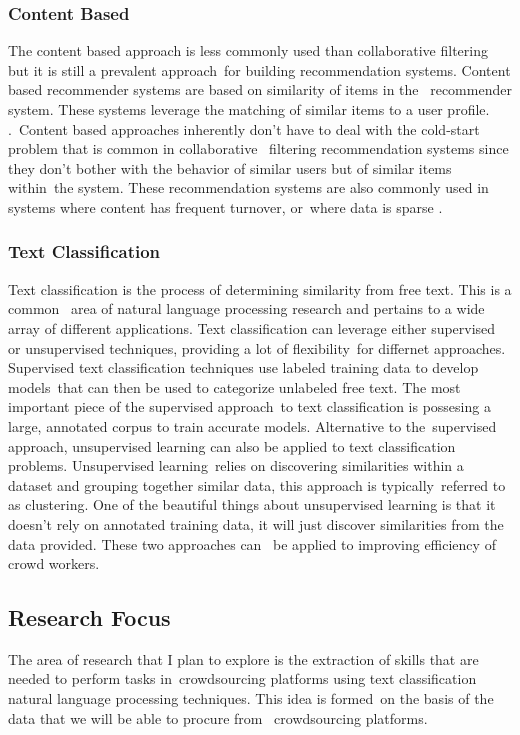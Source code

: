 \documentclass[letterpaper,12pt]{article}
\begin{document}
\subsubsection{Content Based}
The content based approach is less commonly used than collaborative filtering but it is still a prevalent approach\
for building recommendation systems. Content based recommender systems are based on similarity of items in the \
recommender system. These systems leverage the matching of similar items to a user profile. \cite{pazzani2007content}.\
Content based approaches inherently don't have to deal with the cold-start problem that is common in collaborative \
filtering recommendation systems since they don't bother with the behavior of similar users but of similar items within\
the system. These recommendation systems are also commonly used in systems where content has frequent turnover, or\
where data is sparse \cite{okura2017embedding}.

\subsubsection{Text Classification}
Text classification is the process of determining similarity from free text. This is a common \
area of natural language processing research and pertains to a wide array of different applications. 
Text classification can leverage either supervised or unsupervised techniques, providing a lot of flexibility\
for differnet approaches. Supervised text classification techniques use labeled training data to develop models\
that can then be used to categorize unlabeled free text. The most important piece of the supervised approach\
to text classification is possesing a large, annotated corpus to train accurate models. Alternative to the\
supervised approach, unsupervised learning can also be applied to text classification problems. Unsupervised learning\
relies on discovering similarities within a dataset and grouping together similar data, this approach is typically\
referred to as clustering. One of the beautiful things about unsupervised learning is that it doesn't rely on
annotated training data, it will just discover similarities from the data provided. These two approaches can \ 
be applied to improving efficiency of crowd workers.

\subsection{Research Focus}
The area of research that I plan to explore is the extraction of skills that are needed to perform tasks in\
crowdsourcing platforms using text classification natural language processing techniques. This idea is formed\
on the basis of the data that we will be able to procure from \
crowdsourcing platforms. 
\end{document}
